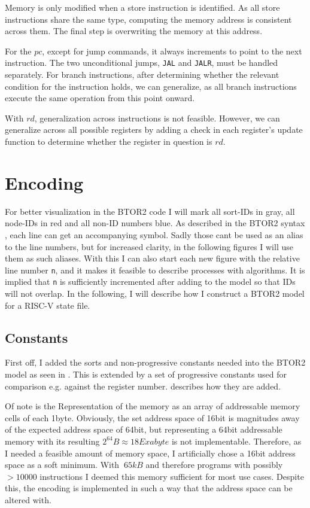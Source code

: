 Memory is only modified when a store instruction is identified. As
all store instructions share the same type, computing the memory
address is consistent across them. The final step is overwriting the
memory at this address.

For the $pc$, except for jump commands, it always increments to point
to the next instruction. The two unconditional jumps, \texttt{JAL}
and \texttt{JALR}, must be handled separately. For branch
instructions, after determining whether the relevant condition for
the instruction holds, we can generalize, as all branch instructions
execute the same operation from this point onward.

With $rd$, generalization across instructions is not feasible.
However, we can generalize across all possible registers by adding a
check in each register's update function to determine whether the
register in question is $rd$.

\section{Encoding}
For better visualization in the BTOR2 code I will mark all sort-IDs
in \textcolor{UniGrey}{gray}, all node-IDs in \textcolor{UniRed}{red}
and all non-ID numbers \textcolor{UniBlue}{blue}. As described in the
BTOR2 syntax \cite[Figure 1]{btor2}, each line can get an
accompanying symbol. Sadly those cant be used as an alias to the line
numbers, but for increased clarity, in the following figures I will
use them as such aliases. With this I can also start each new figure
with the relative line number \texttt{n}, and it makes it feasible to
describe processes with algorithms. It is implied that \texttt{n} is
sufficiently incremented after adding to the model so that IDs will
not overlap. In the following, I will describe how I construct a
BTOR2 model for a RISC-V state file.

\subsection{Constants}
First off, I added the sorts and non-progressive constants needed
into the BTOR2 model as seen in . This is
extended by a set of progressive constants used for comparison e.g.
against the register number. 
describes how they are added.

Of note is the Representation of the memory as an array of
addressable memory cells of each 1byte. Obviously, the set address
space of 16bit is magnitudes away of the expected address space of
64bit, but representing a 64bit addressable memory with its resulting
$2^{64}B \approx 18 Exabyte$ is not implementable. Therefore, as I
needed a feasible amount of memory space, I artificially chose a
16bit address space as a soft minimum. With $~65kB$ and therefore
programs with possibly $>10000$ instructions I deemed this memory
sufficient for most use cases. Despite this, the encoding is
implemented in such a way that the address space can be altered with.

